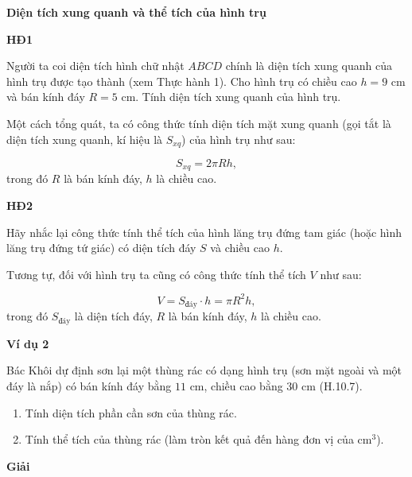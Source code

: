     \answerline

    \textbf{Diện tích xung quanh và thể tích của hình trụ}

    \textbf{HĐ1}

    Người ta coi diện tích hình chữ nhật $ABCD$ chính là diện tích xung quanh của hình trụ được tạo thành (xem Thực hành 1). Cho hình trụ có chiều cao $h=9$ cm và bán kính đáy $R=5$ cm. Tính diện tích xung quanh của hình trụ.

    \answerline
    \answerline

    Một cách tổng quát, ta có công thức tính diện tích mặt xung quanh (gọi tắt là diện tích xung quanh, kí hiệu là $S_{xq}$) của hình trụ như sau:

    \begin{keyconcept}
        \[
            S_{xq}=2\pi Rh,
        \]
        trong đó $R$ là bán kính đáy, $h$ là chiều cao.
    \end{keyconcept}

    \textbf{HĐ2}

    Hãy nhắc lại công thức tính thể tích của hình lăng trụ đứng tam giác (hoặc hình lăng trụ đứng tứ giác) có diện tích đáy $S$ và chiều cao $h$.

    \answerline

    Tương tự, đối với hình trụ ta cũng có công thức tính thể tích $V$ như sau:

    \begin{keyconcept}
        \[
            V=S_{\text{đáy}}\cdot h=\pi R^2h,
        \]
        trong đó $S_{\text{đáy}}$ là diện tích đáy, $R$ là bán kính đáy, $h$ là chiều cao.
    \end{keyconcept}

    \textbf{Ví dụ 2}

    Bác Khôi dự định sơn lại một thùng rác có dạng hình trụ (sơn mặt ngoài và một đáy là nắp) có bán kính đáy bằng $11$ cm, chiều cao bằng $30$ cm (H.10.7).
    \begin{enumerate}[label=\alph*)]
        \item Tính diện tích phần cần sơn của thùng rác.
        \item Tính thể tích của thùng rác (làm tròn kết quả đến hàng đơn vị của $\text{cm}^3$).
    \end{enumerate}


    \textbf{Giải}

